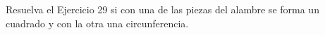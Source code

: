 \item Resuelva el Ejercicio 29 si con una de las piezas del alambre se forma un cuadrado y con la otra una circunferencia.
